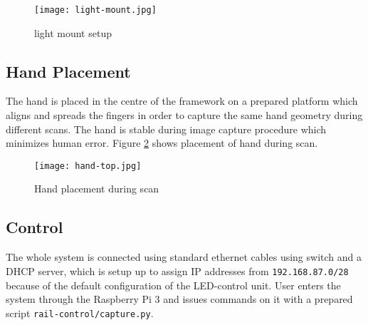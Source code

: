 \begin{figure}[ht!]
    \label{fig:light-mount}
    \centering
    \texttt{[image: light-mount.jpg]}
    \caption{light mount setup}
\end{figure}

\subsection{Hand Placement}
The hand is placed in the centre of the framework on a prepared platform which aligns and spreads the fingers in order to
capture the same hand geometry during different scans. The hand is stable during image capture procedure which minimizes human error.
Figure \ref{fig:hand-placement} shows placement of hand during scan.

\begin{figure}[ht]
    \label{fig:hand-placement}
    \centering
    \texttt{[image: hand-top.jpg]}
    \caption{Hand placement during scan}
\end{figure}

\subsection{Control}
The whole system is connected using standard ethernet cables using switch and a DHCP server, which is setup up to assign IP addresses from 
\texttt{192.168.87.0/28} because of the default configuration of the LED-control unit. User enters the system through the Raspberry Pi 3 and issues
commands on it with a prepared script \texttt{rail-control/capture.py}.

